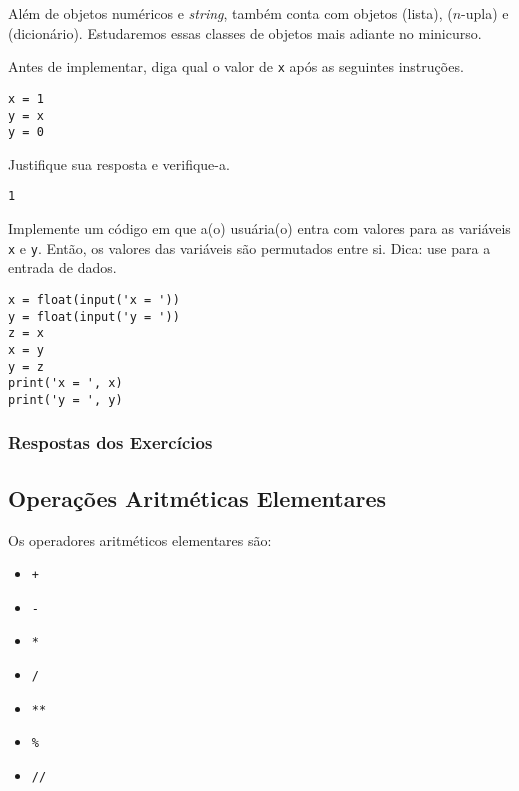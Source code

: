 Além de objetos numéricos e \textit{string}, {\python} também conta com objetos {\PYTHONlist} (lista), {\PYTHONtuple} ($n$-upla) e {\PYTHONdict} (dicionário). Estudaremos essas classes de objetos mais adiante no minicurso.

\begin{exer}
  Antes de implementar, diga qual o valor de \texttt{x} após as seguintes instruções.

\begin{lstlisting}
x = 1
y = x
y = 0
\end{lstlisting}

Justifique sua resposta e verifique-a.
\end{exer}
\begin{resp}
\texttt{1}
\end{resp}

\begin{exer}
  Implemente um código em que a(o) usuária(o) entra com valores para as variáveis \texttt{x} e \texttt{y}. Então, os valores das variáveis são permutados entre si. Dica: use {\PYTHONinput} para a entrada de dados.
\end{exer}
\begin{resp}

\begin{lstlisting}
x = float(input('x = '))
y = float(input('y = '))
z = x
x = y
y = z
print('x = ', x)
print('y = ', y)
\end{lstlisting}

\end{resp}

\ifisbook 
\subsubsection*{Respostas dos Exercícios}
\shipoutAnswer
\fi

\subsection{Operações Aritméticas Elementares}

Os operadores aritméticos elementares são:
\begin{itemize}
\item[] \texttt{+} 
\item[] \texttt{-} 
\item[] \texttt{*} 
\item[] \texttt{/} 
\item[] \texttt{**} 
\item[] \texttt{\%} 
\item[] \texttt{//} 
\end{itemize}

